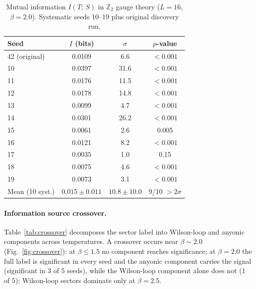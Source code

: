\documentclass[aps,pra,twocolumn,superscriptaddress,showpacs,floatfix]{revtex4-2}
\newcommand{\Ztwo}{\mathbb{Z}_2}
\newcommand{\MI}{I(T;\,S)}
\begin{document}
\begin{table}[b]
\caption{Mutual information $\MI$ in $\Ztwo$ gauge theory ($L=16$, $\beta=2.0$).
Systematic seeds 10--19 plus original discovery run.}
\label{tab:seeds}
\begin{ruledtabular}
\begin{tabular}{lccc}
Seed & $I$ (bits) & $\sigma$ & $p$-value \\
\midrule
42 (original)   & 0.0109 &  6.6 & $<0.001$ \\
10              & 0.0397 & 31.6 & $<0.001$ \\
11              & 0.0176 & 11.5 & $<0.001$ \\
12              & 0.0178 & 14.8 & $<0.001$ \\
13              & 0.0099 &  4.7 & $<0.001$ \\
14              & 0.0301 & 26.2 & $<0.001$ \\
15              & 0.0061 &  2.6 & 0.005 \\
16              & 0.0121 &  8.2 & $<0.001$ \\
17              & 0.0035 &  1.0 & 0.15 \\
18              & 0.0075 &  4.6 & $<0.001$ \\
19              & 0.0073 &  3.1 & $<0.001$ \\
\midrule
Mean (10 syst.) & $0.015 \pm 0.011$ & $10.8 \pm 10.0$ & 9/10 ${>}2\sigma$ \\
\end{tabular}
\end{ruledtabular}
\end{table}

\paragraph{Information source crossover.}
Table~\ref{tab:crossover} decomposes the sector label into Wilson-loop and
anyonic components across temperatures. A crossover occurs near $\beta \sim 2.0$
(Fig.~\ref{fig:crossover}): at $\beta \leq 1.5$ no component reaches
significance; at $\beta = 2.0$ the full label is significant in every seed and
the anyonic component carries the signal (significant in 3 of 5 seeds), while
the Wilson-loop component alone does not (1 of 5); Wilson-loop sectors dominate
only at $\beta = 2.5$.
\end{document}
